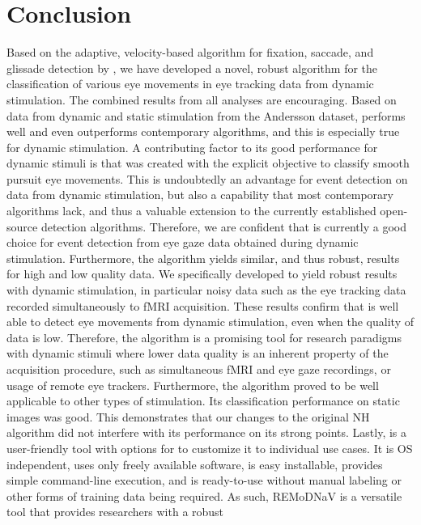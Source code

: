     \section*{Conclusion}\label{con}
    Based on the adaptive, velocity-based algorithm for fixation, saccade, and
    glissade detection by \cite{Nystrom2010AnData}, we have developed a novel,
    robust algorithm for the classification of various eye movements in eye tracking
    data from dynamic stimulation.
    The combined results from all analyses are encouraging. Based on data from dynamic and static stimulation from the
    Andersson dataset, \remodnav performs well and even outperforms contemporary algorithms, and this is especially true
    for dynamic stimulation. A contributing factor to its good performance for dynamic stimuli is that \remodnav was
    created with the explicit objective to classify smooth pursuit eye movements. This is undoubtedly an advantage for
    event detection on data from dynamic stimulation, but also a capability that most contemporary algorithms lack, and
    thus a valuable extension to the currently established open-source detection algorithms. Therefore, we are confident
    that \remodnav is currently a good choice for event detection from eye gaze data obtained during dynamic stimulation.
    Furthermore, the algorithm yields similar, and thus robust, results for high and low quality data. We specifically
    developed \remodnav to yield robust results with dynamic stimulation, in particular noisy data such as the eye
    tracking data recorded simultaneously to fMRI acquisition. These results confirm that \remodnav is well able to detect
    eye movements from dynamic stimulation, even when the quality of data is low. Therefore, the algorithm is a promising
    tool for research paradigms with dynamic stimuli where lower data quality is an inherent property of the acquisition
    procedure, such as simultaneous fMRI and eye gaze recordings, or usage of remote eye trackers.
    Furthermore, the algorithm proved to be well applicable to other types of stimulation. Its classification
    performance on static images was good. This demonstrates that our changes to the original NH algorithm did not
    interfere with its performance on its strong points. Lastly, \remodnav is a user-friendly tool with options for
    to customize it to individual use cases. It is OS independent, uses only freely available software, is easy
    installable, provides simple command-line execution, and is ready-to-use without manual labeling or other forms
    of training data being required. As such, REMoDNaV is a versatile tool that provides researchers with a robust
